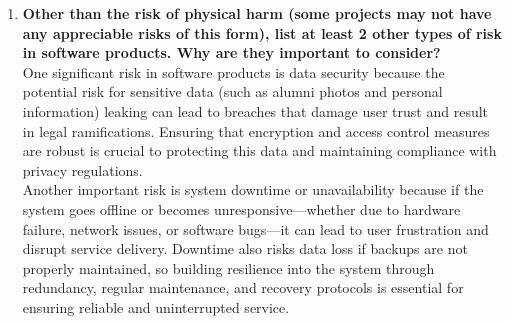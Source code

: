 \documentclass{article}
\begin{document}
\begin{enumerate}
  \item \textbf{Other than the risk of physical harm (some projects may not have any appreciable risks of this form), list at least 2 other types of risk in software products. Why are they important to consider?} \\
  One significant risk in software products is data security because the potential risk for sensitive data (such as alumni photos and personal information) leaking can lead to breaches that damage user trust and result in legal ramifications. Ensuring that encryption and access control measures are robust is crucial to protecting this data and maintaining compliance with privacy regulations. \\
  Another important risk is system downtime or unavailability because if the system goes offline or becomes unresponsive—whether due to hardware failure, network issues, or software bugs—it can lead to user frustration and disrupt service delivery. Downtime also risks data loss if backups are not properly maintained, so building resilience into the system through redundancy, regular maintenance, and recovery protocols is essential for ensuring reliable and uninterrupted service.
\end{enumerate}
\end{document}
